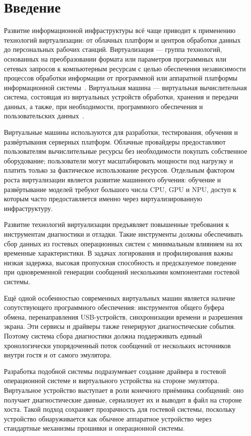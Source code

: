 \section{Введение}
\label{sec:Chapter0} 

Развитие информационной инфраструктуры всё чаще приводит к применению
технологий виртуализации: от облачных платформ и центров обработки данных до
персональных рабочих станций. Виртуализация --- группа технологий, основанных
на преобразовании формата или параметров программных или сетевых запросов к
компьютерным ресурсам с целью обеспечения независимости процессов обработки
информации от программной или аппаратной платформы информационной
системы~\cite{gost_virt}. Виртуальная машина --- виртуальная вычислительная
система, состоящая из виртуальных устройств обработки, хранения и передачи
данных, а также, при необходимости, программного обеспечения и пользовательских
данных~\cite{gost_virt}.

Виртуальные машины используются для разработки, тестирования, обучения и
развёртывания серверных платформ. Облачные провайдеры предоставляют
пользователям вычислительные ресурсы без необходимости покупать собственное
оборудование; пользователи могут масштабировать мощности под нагрузку и платить
только за фактическое использование ресурсов. Отдельным фактором роста
виртуализации является развитие машинного обучения: обучение и развёртывание
моделей требуют большого числа CPU, GPU и NPU, доступ к которым часто
предоставляется именно через виртуализированную инфраструктуру.

Развитие технологий виртуализации предъявляет повышенные требования к
инструментам диагностики и отладки. Такие инструменты должны обеспечивать сбор
данных из гостевых операционных систем с минимальным влиянием на их временные
характеристики. В задачах логирования и профилирования важны низкая задержка,
высокая пропускная способность и предсказуемое поведение при одновременной
генерации сообщений несколькими компонентами гостевой системы.

Ещё одной особенностью современных виртуальных машин является наличие
сопутствующего программного обеспечения: инструментов общего буфера обмена,
перенаправления USB-устройств, синхронизации времени и разрешения экрана. Эти
сервисы и драйверы также генерируют диагностические события. Поэтому система
сбора диагностики должна поддерживать единый хронологически упорядоченный поток
сообщений от нескольких источников внутри гостя и от самого эмулятора.

Разработка подобной системы подразумевает создание драйвера в гостевой
операционной системе и виртуального устройства на стороне эмулятора. Виртуальное
устройство выступает в роли конечного приёмника сообщений: оно получает
диагностические данные, сериализует их и выводит в файл на стороне хоста. Такой
подход сохраняет прозрачность для гостевой системы, поскольку устройство
обнаруживается как обычное аппаратное устройство через стандартные механизмы
прошивки и операционной системы.

